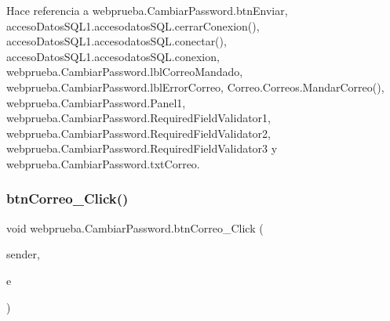 \begin{DoxyCode}{0}

\end{DoxyCode}


Hace referencia a webprueba.\+Cambiar\+Password.\+btn\+Enviar, acceso\+Datos\+S\+Q\+L1.\+accesodatos\+S\+Q\+L.\+cerrar\+Conexion(), acceso\+Datos\+S\+Q\+L1.\+accesodatos\+S\+Q\+L.\+conectar(), acceso\+Datos\+S\+Q\+L1.\+accesodatos\+S\+Q\+L.\+conexion, webprueba.\+Cambiar\+Password.\+lbl\+Correo\+Mandado, webprueba.\+Cambiar\+Password.\+lbl\+Error\+Correo, Correo.\+Correos.\+Mandar\+Correo(), webprueba.\+Cambiar\+Password.\+Panel1, webprueba.\+Cambiar\+Password.\+Required\+Field\+Validator1, webprueba.\+Cambiar\+Password.\+Required\+Field\+Validator2, webprueba.\+Cambiar\+Password.\+Required\+Field\+Validator3 y webprueba.\+Cambiar\+Password.\+txt\+Correo.

\mbox{\label{classwebprueba_1_1_cambiar_password_a763f5a890b60db92bb1e33dba70b9a11}} 
\subsubsection{\texorpdfstring{btnCorreo\_Click()}{btnCorreo\_Click()}\hspace{0.1cm}{\footnotesize\ttfamily [2/2]}}
{\footnotesize\ttfamily void webprueba.\+Cambiar\+Password.\+btn\+Correo\+\_\+\+Click (\begin{DoxyParamCaption}\item[{object}]{sender,  }\item[{Event\+Args}]{e }\end{DoxyParamCaption})\hspace{0.3cm}{\ttfamily [protected]}}



